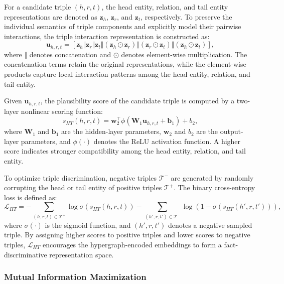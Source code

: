 \documentclass[pdflatex,sn-mathphys-num]{sn-jnl}
\begin{document}
For a candidate triple $(h,r,t)$, the head entity, relation, and tail entity representations are denoted as $\mathbf{z}_{h}$, $\mathbf{z}_{r}$, and $\mathbf{z}_{t}$, respectively. To preserve the individual semantics of triple components and explicitly model their pairwise interactions, the triple interaction representation is constructed as:
\begin{equation}
\mathbf{u}_{h,r,t}
=
\left[
\mathbf{z}_{h}
\Vert
\mathbf{z}_{r}
\Vert
\mathbf{z}_{t}
\Vert
(\mathbf{z}_{h}\odot\mathbf{z}_{r})
\Vert
(\mathbf{z}_{r}\odot\mathbf{z}_{t})
\Vert
(\mathbf{z}_{h}\odot\mathbf{z}_{t})
\right],
\end{equation}
where $\Vert$ denotes concatenation and $\odot$ denotes element-wise multiplication. The concatenation terms retain the original representations, while the element-wise products capture local interaction patterns among the head entity, relation, and tail entity.

Given $\mathbf{u}_{h,r,t}$, the plausibility score of the candidate triple is computed by a two-layer nonlinear scoring function:
\begin{equation}
s_{HT}(h,r,t)
=
\mathbf{w}_{2}^{\top}
\phi
\left(
\mathbf{W}_{1}\mathbf{u}_{h,r,t}
+
\mathbf{b}_{1}
\right)
+
b_{2},
\end{equation}
where $\mathbf{W}_{1}$ and $\mathbf{b}_{1}$ are the hidden-layer parameters, $\mathbf{w}_{2}$ and $b_{2}$ are the output-layer parameters, and $\phi(\cdot)$ denotes the ReLU activation function. A higher score indicates stronger compatibility among the head entity, relation, and tail entity.

To optimize triple discrimination, negative triples $\mathcal{T}^{-}$ are generated by randomly corrupting the head or tail entity of positive triples $\mathcal{T}^{+}$. The binary cross-entropy loss is defined as:
\begin{equation}
\mathcal{L}_{HT}
=
-\sum_{(h,r,t)\in\mathcal{T}^{+}}
\log
\sigma
\left(
s_{HT}(h,r,t)
\right)
-
\sum_{(h',r,t')\in\mathcal{T}^{-}}
\log
\left(
1-
\sigma
\left(
s_{HT}(h',r,t')
\right)
\right),
\end{equation}
where $\sigma(\cdot)$ is the sigmoid function, and $(h',r,t')$ denotes a negative sampled triple. By assigning higher scores to positive triples and lower scores to negative triples, $\mathcal{L}_{HT}$ encourages the hypergraph-encoded embeddings to form a fact-discriminative representation space.

\subsubsection{Mutual Information Maximization}
\end{document}
